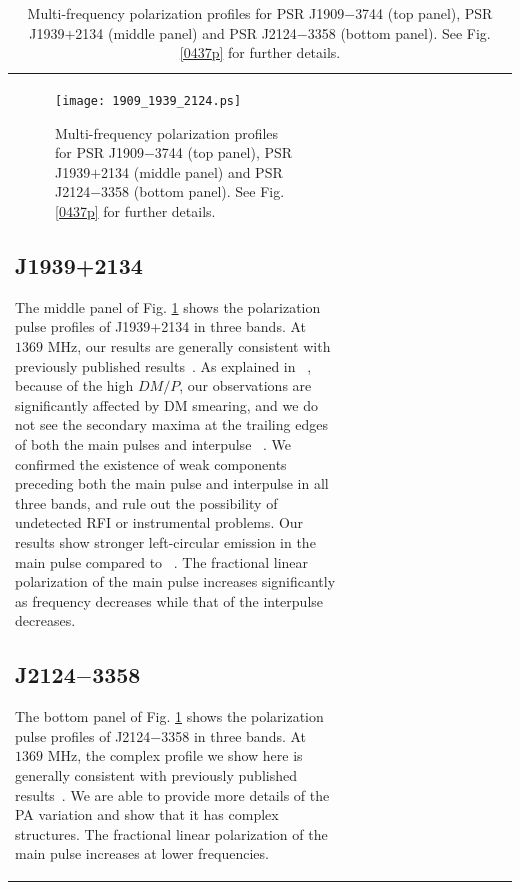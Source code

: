 \documentclass[useAMS,usenatbib]{mn2e}
\begin{document}
\begin{table}
\begin{center}
\begin{tabular}{lcccccccccccc}
\begin{figure}
\begin{center}
\texttt{[image: 1909\_1939\_2124.ps]}
\caption{Multi-frequency polarization profiles for PSR J1909$-$3744 (top 
panel), PSR J1939$+$2134 (middle panel) and PSR J2124$-$3358 (bottom panel). 
See Fig. \ref{0437p} for further details.}
\label{1909p}
\end{center}
\end{figure}

\subsection{J1939+2134}

The middle panel of Fig. \ref{1909p} shows the polarization pulse profiles of 
J1939+2134 
in three bands.
%
At $1369$ MHz, our results are generally consistent with previously published 
results~\citep{Yan11}.
%
As explained in ~\citet{Yan11}, because of the high $DM/P$, our observations 
are significantly affected by DM smearing, and we do not see the secondary 
maxima at the trailing edges of both the main pulses and interpulse
~\citep{Thorsett90,Stairs99,Ord04}.
%
We confirmed the existence of weak components preceding both the main pulse 
and interpulse in all three bands, and rule out the possibility of undetected 
RFI or instrumental problems.
%
Our results show stronger left-circular emission in the main pulse compared 
to ~\citep{Yan11}.
%
The fractional linear polarization of the main pulse increases significantly 
as frequency decreases while that of the interpulse decreases.



\subsection{J2124$-$3358}

The bottom panel of Fig. \ref{1909p} shows the polarization pulse profiles of 
J2124$-$3358 
in three bands.
%
At $1369$ MHz, the complex profile we show here is generally consistent with previously published results~\citep{Yan11}.
%
We are able to provide more details of the PA variation and show that it has 
complex structures.
%
The fractional linear polarization of the main pulse increases at lower 
frequencies.


\end{tabular}
\end{center}
\end{table}
\end{document}
